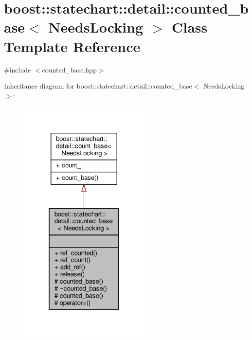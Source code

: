 \hypertarget{classboost_1_1statechart_1_1detail_1_1counted__base}{}\section{boost\+:\+:statechart\+:\+:detail\+:\+:counted\+\_\+base$<$ Needs\+Locking $>$ Class Template Reference}
\label{classboost_1_1statechart_1_1detail_1_1counted__base}


{\ttfamily \#include $<$counted\+\_\+base.\+hpp$>$}



Inheritance diagram for boost\+:\+:statechart\+:\+:detail\+:\+:counted\+\_\+base$<$ Needs\+Locking $>$\+:
\nopagebreak
\begin{figure}[H]
\begin{center}
\leavevmode
\includegraphics[width=187pt]{classboost_1_1statechart_1_1detail_1_1counted__base__inherit__graph}
\end{center}
\end{figure}


